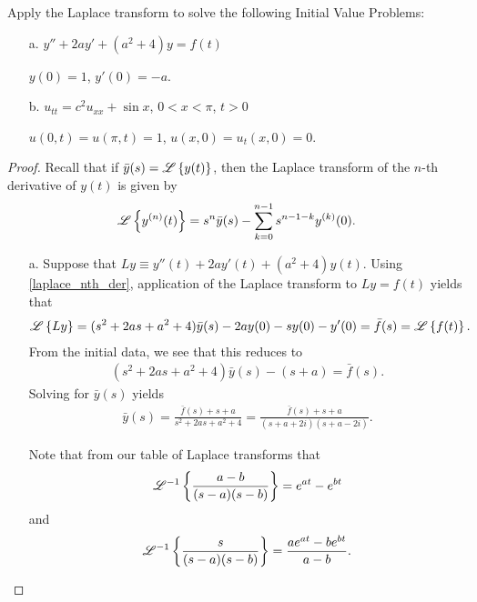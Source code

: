 \begin{problem}{3}
  Apply the Laplace transform to solve the following Initial Value Problems:
  \begin{enumerate}
    \item[a.] $y'' + 2 a y' + (a^2 + 4)y = f(t)$

      $y(0) = 1$, \quad $y'(0) = -a$.

    \item[b.] $u_{tt} = c^2 u_{xx} + \sin x$, \quad  $0 < x < \pi$, \quad $t > 0$

      $u(0, t) = u(\pi, t) = 1$, \quad $u(x, 0) = u_t(x, 0) = 0$.
  \end{enumerate}
\end{problem}

\begin{proof}
  Recall that if $\bar{y}(s) = \mathscr{L}\left\{ {y(t)} \right\}$, then the Laplace transform of the
  $n$-th derivative of $y(t)$ is given by
  \begin{align}\label{laplace_nth_der}
    \mathscr{L}\left\{ {y^{(n)}(t)} \right\} = s^n \bar{y}(s) - \sum_{k=0}^{n-1} s^{n-1-k} y^{(k)}(0).
  \end{align}

  \begin{enumerate}
    \item[a.] Suppose that $Ly \equiv y''(t) + 2a y'(t) + (a^2 + 4)y(t)$. Using \eqref{laplace_nth_der}, application of the Laplace transform
      to $Ly = f(t)$ yields that
      \begin{align*}
        \mathscr{L}\left\{ {Ly} \right\} = (s^2 +2as +a^2+4)\bar{y}(s) -2 a y(0)  -s y(0) - y'(0) = \bar{f}(s) = \mathscr{L}\left\{ {f(t)} \right\}.
      \end{align*}
      From the initial data, we see that this reduces to
      \begin{align*}
        (s^2 +2as +a^2+4)\bar{y}(s) -(s+a) = \bar{f}(s).
      \end{align*}
      Solving for $\bar{y}(s)$ yields
      \begin{align*}
        \bar{y}(s) = \frac{\bar{f}(s) + s + a}{s^2 +2as +a^2+4} = \frac{\bar{f}(s) + s + a}{(s+a+2i)(s+a-2i)}.
      \end{align*}

      Note that from our table of Laplace transforms that
      \begin{align*}
        \mathscr{L}^{-1}\left\{ {\frac{a-b}{(s-a)(s-b)}} \right\} = e^{at}-e^{bt}
      \end{align*}
      and
      \begin{align*}
        \mathscr{L}^{-1}\left\{ {\frac{s}{(s-a)(s-b)}} \right\} = \frac{ae^{at}-be^{bt}}{a-b}.
      \end{align*}


\end{enumerate}
\end{proof}

